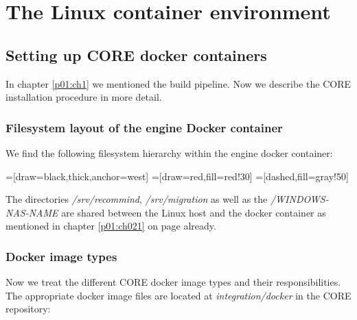 \chapter{The Linux container environment}
	\section{Setting up CORE docker containers}
	In chapter \ref{p01:ch1} we mentioned the build pipeline. Now we describe the CORE installation procedure in more detail.

		\subsection{Filesystem layout of the engine Docker container}
		We find the following filesystem hierarchy within the engine docker container:
		
		=[draw=black,thick,anchor=west]
		=[draw=red,fill=red!30]
		=[dashed,fill=gray!50]
	
		The directories \emph{/srv/recommind}, \emph{/srv/migration} as well as the \emph{/WINDOWS-NAS-NAME} are shared between the Linux host and the docker container as mentioned in chapter \ref{p01:ch021} on page \pageref{p01:ch021} already.

		\subsection{Docker image types}
		Now we treat the different CORE docker image types and their responsibilities. The appropriate docker image files are located at \emph{integration/docker} in the CORE repository:
				
